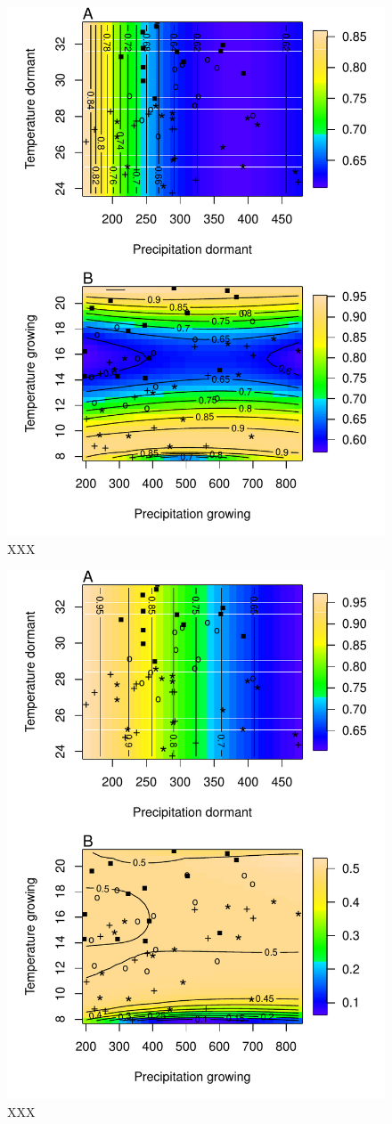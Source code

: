 \documentclass[12pt]{article}
\begin{document}
\begin{figure}[H]
  \begin{center}
    \includegraphics[width=0.85\linewidth]{Figures/OSR.pdf}
  \caption{XXX}
  \label{Sup:OSR}
  \end{center}
\end{figure}

\begin{figure}[H]
  \begin{center}
    \includegraphics[width=0.85\linewidth]{Figures/SR.pdf}
  \caption{XXX}
  \label{Sup:SR}
  \end{center}
\end{figure}
\end{document}
